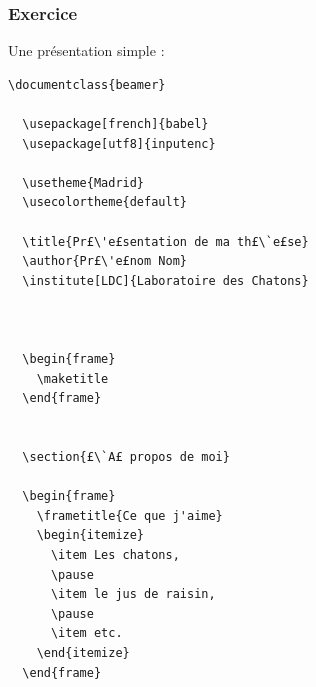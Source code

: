\begin{frame}[fragile]
  \frametitle{Exercice}

Une présentation simple :

\begin{lstlisting}[multicols=2]
  \documentclass{beamer}

  \usepackage[french]{babel}
  \usepackage[utf8]{inputenc}

  \usetheme{Madrid}
  \usecolortheme{default}

  \title{Pr£\'e£sentation de ma th£\`e£se}
  \author{Pr£\'e£nom Nom}
  \institute[LDC]{Laboratoire des Chatons}

  

  \begin{frame}
    \maketitle
  \end{frame}

  
  \section{£\`A£ propos de moi}

  \begin{frame}
    \frametitle{Ce que j'aime}
    \begin{itemize}
      \item Les chatons,
      \pause
      \item le jus de raisin,
      \pause
      \item etc.
    \end{itemize}
  \end{frame}

  
\end{lstlisting}

\end{frame}


